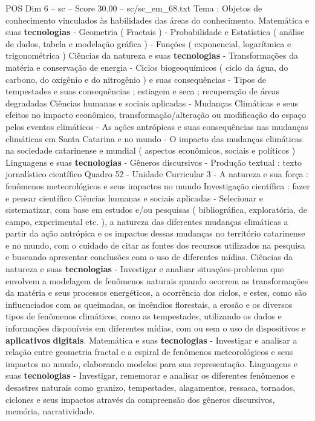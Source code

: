 \begin{textsample}{POS Dim 6 – sc – Score 30.00 – sc/sc\_em\_68.txt}
Tema : Objetos de conhecimento vinculados às habilidades das áreas do conhecimento.
Matemática e suas \textbf{tecnologias} - Geometria ( Fractais ) - Probabilidade e Estatística ( análise de dados, tabela e modelação gráfica ) - Funções ( exponencial, logarítmica e trigonométrica ) Ciências da natureza e suas \textbf{tecnologias} - Transformações da matéria e conservação de energia - Ciclos biogeoquímicos ( ciclo da água, do carbono, do oxigênio e do nitrogênio ) e suas consequências - Tipos de tempestades e suas consequências ; estiagem e seca ; recuperação de áreas degradadas Ciências humanas e sociais aplicadas - Mudanças Climáticas e seus efeitos no impacto econômico, transformação/alteração ou modificação do espaço pelos eventos climáticos - As ações antrópicas e suas consequências nas mudanças climáticas em Santa Catarina e no mundo - O impacto das mudanças climáticas na sociedade catarinense e mundial ( aspectos econômicos, sociais e políticos ) Linguagens e suas \textbf{tecnologias} - Gêneros discursivos - Produção textual : texto jornalístico científico Quadro 52 - Unidade Curricular 3 - A natureza e sua força : fenômenos meteorológicos e seus impactos no mundo Investigação científica : fazer e pensar científico Ciências humanas e sociais aplicadas - Selecionar e sistematizar, com base em estudos e/ou pesquisas ( bibliográfica, exploratória, de campo, experimental etc. ), a natureza das diferentes mudanças climáticas a partir da ação antrópica e os impactos dessas mudanças no território catarinense e no mundo, com o cuidado de citar as fontes dos recursos utilizados na pesquisa e buscando apresentar conclusões com o uso de diferentes mídias.
Ciências da natureza e suas \textbf{tecnologias} - Investigar e analisar situações-problema que envolvem a modelagem de fenômenos naturais quando ocorrem as transformações da matéria e seus processos energéticos, a ocorrência dos ciclos, e estes, como são influenciados com as queimadas, os incêndios florestais, a erosão e os diversos tipos de fenômenos climáticos, como as tempestades, utilizando os dados e informações disponíveis em diferentes mídias, com ou sem o uso de dispositivos e \textbf{aplicativos} \textbf{digitais}.
Matemática e suas \textbf{tecnologias} - Investigar e analisar a relação entre geometria fractal e a espiral de fenômenos meteorológicos e seus impactos no mundo, elaborando modelos para sua representação.
Linguagens e suas \textbf{tecnologias} - Investigar, rememorar e analisar os diferentes fenômenos e desastres naturais como granizo, tempestades, alagamentos, ressaca, tornados, ciclones e seus impactos através da compreensão dos gêneros discursivos, memória, narratividade.

\end{textsample}
